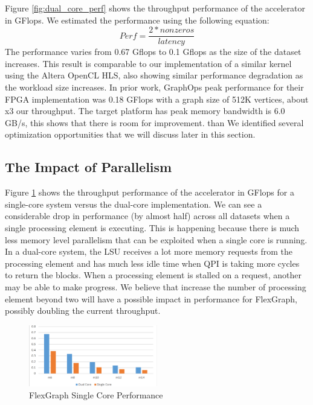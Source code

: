 Figure \ref{fig:dual_core_perf} shows the throughput performance of the accelerator in GFlops. We estimated the performance using the following equation:
\[Perf = \dfrac{2 * nonzeros}{latency}\]
The performance varies from 0.67 Gflops to 0.1 Gflops as the size of the dataset increases. This result is comparable to our implementation of a similar kernel using the Altera OpenCL HLS, also showing similar performance degradation as the workload size increases. In prior work, GraphOps \cite{GraphOps} peak performance for their FPGA implementation was 0.18 GFlops with a graph size of 512K vertices, about x3 our throughput. The target platform has peak memory bandwidth is 6.0 GB/s, this shows that there is room for improvement. than We identified several optimization opportunities that we will discuss later in this section. 

\subsection{The Impact of Parallelism}

Figure \ref{fig:single_core_perf} shows the throughput performance of the accelerator in GFlops for a single-core system versus the dual-core implementation. We can see a considerable drop in performance (by almost half) across all datasets when a single processing element is executing. This is happening because there is much less memory level parallelism that can be exploited when a single core is running. In a dual-core system, the LSU receives a lot more memory requests from the processing element and has much less idle time when QPI is taking more cycles to return the blocks. When a processing element is stalled on a request, another may be able to make progress. We believe that increase the number of processing element beyond two will have a possible impact in performance for FlexGraph, possibly doubling the current throughput.

\begin{figure}[htbp]
\centering
\includegraphics[width=0.5\textwidth]{figures/single_core_perf}
\caption{FlexGraph Single Core Performance}
\label{fig:single_core_perf}
\end{figure}

